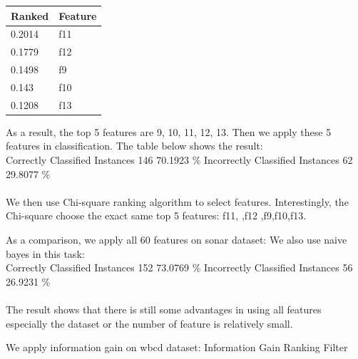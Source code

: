 \documentclass[11pt, a4paper, oneside, openright]{article}
\begin{document}
\begin{table}[H]
\centering
\begin{tabular}{|l|l|}
\hline
\multicolumn{1}{|c|}{\textbf{Ranked}} & \multicolumn{1}{c|}{\textbf{Feature}} \\
\hline
0.2014    &f11                                     \\
\hline
0.1779    &f12                                \\
\hline
0.1498  &f9                                             \\
\hline
0.143   &f10                                             \\
\hline
0.1208   &f13                                             \\
\hline
\end{tabular}
\end{table}


As a result,  the top 5 features are 9, 10, 11, 12, 13. Then we apply these 5 features in classification. The table below shows the result:
\\
\newline Correctly Classified Instances      \hspace * {4mm}   146       \hspace * {4mm}        70.1923 \%
\newline Incorrectly Classified Instances    \hspace * {4mm}    62   \hspace * {4mm}            29.8077 \%
\\
\\
We then use Chi-square ranking algorithm to select features. Interestingly, the Chi-square choose the exact same top 5 features: f11, ,f12 ,f9,f10,f13.

As a comparison, we apply all 60 features on sonar dataset:
We also use naive bayes in this task:
\\
\newline Correctly Classified Instances     \hspace * {4mm}    152      \hspace * {4mm}         73.0769 \%
\newline Incorrectly Classified Instances   \hspace * {4mm}     56       \hspace * {4mm}        26.9231 \%
\\
\\
The result shows that there is still some advantages in using all features especially the dataset or the number of feature is relatively small.

We apply information gain on wbcd dataset:
Information Gain Ranking Filter
\end{document}
